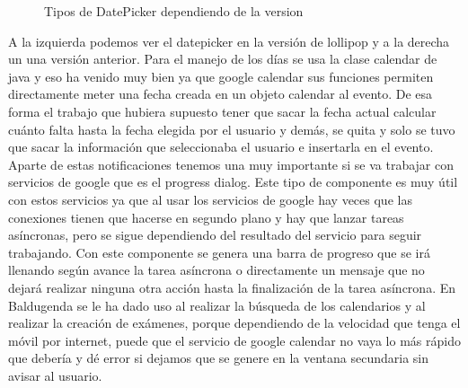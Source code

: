 \begin{figure}[H]
 \centering
 \caption{Tipos de DatePicker dependiendo de la version}
 \label{f:Tipos de DatePicker dependiendo de la version}
\end{figure}

A la izquierda podemos ver el datepicker en la versión de lollipop y a la derecha un una versión anterior.
Para el manejo de los días se usa la clase calendar de java y eso ha venido muy bien ya que google calendar sus funciones permiten directamente meter una fecha creada en un objeto calendar al evento.
De esa forma el trabajo que hubiera supuesto tener que sacar la fecha actual calcular cuánto falta hasta la fecha elegida por el usuario y demás, se quita y solo se tuvo que sacar la información que seleccionaba el usuario e insertarla en el evento.
Aparte de estas notificaciones tenemos  una muy importante si se va trabajar con servicios de google que es el progress dialog.
Este tipo de componente es muy útil con estos servicios ya que al usar los servicios de google hay veces que las conexiones tienen que hacerse en segundo plano y hay que lanzar tareas asíncronas, pero se sigue dependiendo del resultado del servicio para seguir trabajando.
Con este componente se genera una barra de progreso que se irá llenando según avance la tarea asíncrona o directamente un mensaje que no dejará realizar ninguna otra acción hasta la finalización de la tarea asíncrona.
En Baldugenda se le ha dado uso al realizar la búsqueda de los calendarios y al realizar la creación de exámenes, porque dependiendo de la velocidad que tenga el móvil por internet, puede que el servicio de google calendar no vaya lo más rápido que debería y dé error si dejamos que se genere en la ventana secundaria sin avisar al usuario. 

